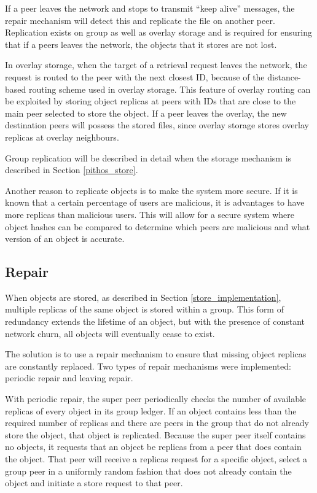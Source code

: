 If a peer leaves the network and stops to transmit ``keep alive'' messages, the repair mechanism will detect this and replicate the file on another peer. Replication exists on group as well as overlay storage and is required for ensuring that if a peers leaves the network, the objects that it stores are not lost.

In overlay storage, when the target of a retrieval request leaves the network, the request is routed to the peer with the next closest ID, because of the distance-based routing scheme used in overlay storage. This feature of overlay routing can be exploited by storing object replicas at peers with IDs that are close to the main peer selected to store the object. If a peer leaves the overlay, the new destination peers will possess the stored files, since overlay storage stores overlay replicas at overlay neighbours.

Group replication will be described in detail when the storage mechanism is described in Section \ref{pithos_store}.

Another reason to replicate objects is to make the system more secure. If it is known that a certain percentage of users are malicious, it is advantages to have more replicas than malicious users. This will allow for a secure system where object hashes can be compared to determine which peers are malicious and what version of an object is accurate.

\subsection{Repair}

When objects are stored, as described in Section \ref{store_implementation}, multiple replicas of the same object is stored within a group. This form of redundancy extends the lifetime of an object, but with the presence of constant network churn, all objects will eventually cease to exist.

The solution is to use a repair mechanism to ensure that missing object replicas are constantly replaced. Two types of repair mechanisms were implemented: periodic repair and leaving repair.

With periodic repair, the super peer periodically checks the number of available replicas of every object in its group ledger. If an object contains less than the required number of replicas and there are peers in the group that do not already store the object, that object is replicated. Because the super peer itself contains no objects, it requests that an object be replicas from a peer that does contain the object. That peer will receive a replicas request for a specific object, select a group peer in a uniformly random fashion that does not already contain the object and initiate a store request to that peer.

